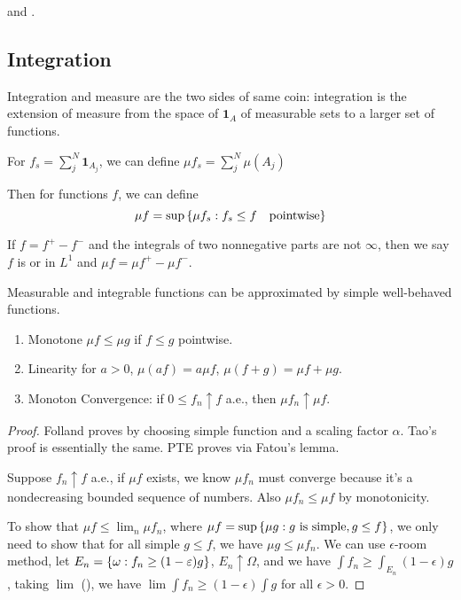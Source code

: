  and . 

\subsection{Integration}

Integration and measure are the two sides of same coin: integration is the extension of measure from the space of  \(\mathbf{1}_{A}\) of measurable sets to a larger set of functions. 

For  \(f_{s} = \sum^{N}_{j} \mathbf{1}_{A_{j}}\), we can define \(\mu f_{s} = \sum^{N}_{j} \mu(A_{j})\)


Then for  functions \(f\), we can define 
\begin{equation*}
    \mu f = \sup \Bqty{\mu f_{s} : f_{s} \leq f \quad \text{pointwise}}
\end{equation*}

If \(f = f^{+} - f^{-}\) and the integrals of two nonnegative parts are not \(\infty\), then we say \(f\) is  or in \({L}^{1}\) and \(\mu f = \mu f^{+} - \mu f^{-}\).  

\begin{thm}
    Measurable and integrable functions can be approximated by simple well-behaved functions.   
\end{thm}
\begin{thm}
    \begin{enumerate}
        \item Monotone \(\mu f \leq \mu g\) if \(f \leq g\) pointwise.
        \item Linearity for \(a > 0\), \(\mu (af) = a \mu f\), \(\mu(f + g)=  \mu f + \mu g\).
        \item Monoton Convergence: if \(0 \leq f_{n} \uparrow f\) a.e., then \(\mu f_{n} \uparrow \mu f\). 
    \end{enumerate}
\end{thm}
\begin{proof}
    Folland proves by choosing simple function and a scaling factor \(\alpha\). Tao's proof is essentially the same.
    PTE proves via Fatou's lemma. 
    
    Suppose \(f_{n}\uparrow f\) a.e., if \(\mu f\) exists, we know \(\mu f_{n}\) must converge because it's a nondecreasing bounded sequence of numbers. Also \(\mu f_{n} \leq \mu f\) by monotonicity. 

    To show that \(\mu f \leq \lim_{n} \mu f_{n}\), where \(\mu f = \sup \Bqty{\mu g: g \text{ is simple}, g \leq f}\), we only need to show that for all simple \(g \leq f\), we have \(\mu g \leq \mu f_{n}\). We can use \(\epsilon\)-room method, let \(E_{n} = \Bqty{\omega: f_{n} \geq (1 - \epsilon) g}\), \(E_{n} \uparrow \Omega\), and we have \(\int f_{n} \geq \int_{E_{n}} (1 - \epsilon)g\), taking \(\lim\) (), we have \(\lim \int f_{n} \geq (1 - \epsilon) \int g\) for all \(\epsilon> 0\). 
\end{proof}


